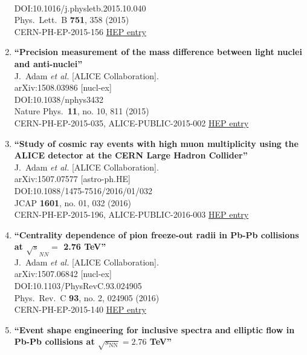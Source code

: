 \begin{enumerate}
  \\{}DOI:10.1016/j.physletb.2015.10.040
  \\{}Phys.\ Lett.\ B {\bf 751}, 358 (2015)
  \\{}CERN-PH-EP-2015-156
\href{http://inspirehep.net/record/1388730}{HEP entry}
\item%
{\bf ``Precision measurement of the mass difference between light nuclei and anti-nuclei''}
  \\{}J.~Adam {\it et al.} [ALICE Collaboration].
  \\{}arXiv:1508.03986 [nucl-ex]
  \\{}DOI:10.1038/nphys3432
  \\{}Nature Phys.\  {\bf 11}, no. 10, 811 (2015)
  \\{}CERN-PH-EP-2015-035, ALICE-PUBLIC-2015-002
\href{http://inspirehep.net/record/1388181}{HEP entry}
\item%
{\bf ``Study of cosmic ray events with high muon multiplicity using the ALICE detector at the CERN Large Hadron Collider''}
  \\{}J.~Adam {\it et al.} [ALICE Collaboration].
  \\{}arXiv:1507.07577 [astro-ph.HE]
  \\{}DOI:10.1088/1475-7516/2016/01/032
  \\{}JCAP {\bf 1601}, no. 01, 032 (2016)
  \\{}CERN-PH-EP-2015-196, ALICE-PUBLIC-2016-003
\href{http://inspirehep.net/record/1385276}{HEP entry}
\item%
{\bf ``Centrality dependence of pion freeze-out radii in Pb-Pb collisions at $\sqrt{s}_{NN}=$ 2.76 TeV''}
  \\{}J.~Adam {\it et al.} [ALICE Collaboration].
  \\{}arXiv:1507.06842 [nucl-ex]
  \\{}DOI:10.1103/PhysRevC.93.024905
  \\{}Phys.\ Rev.\ C {\bf 93}, no. 2, 024905 (2016)
  \\{}CERN-PH-EP-2015-140
\href{http://inspirehep.net/record/1384807}{HEP entry}
\item%
{\bf ``Event shape engineering for inclusive spectra and elliptic flow in Pb-Pb collisions at $\sqrt{s_\mathrm{NN}}=2.76$ TeV''}

\end{enumerate}
